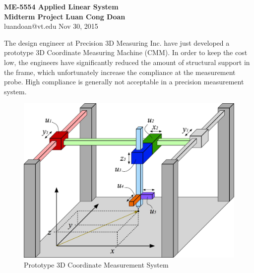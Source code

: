 \documentclass[14pt,a4paper]{article}
\begin{document}
\label{cover}
\begin{center}
	\vspace*{3cm}
	\large{\textbf{ME-5554 Applied Linear System \\ Midterm Project}}
	\vfill
	\textbf{Luan Cong Doan} \\ luandoan@vt.edu
	\vfill
	Nov 30, 2015
\end{center}
\pagebreak

The design engineer at Precision 3D Measuring Inc. have just developed a prototype 3D Coordinate Measuring Machine (CMM). In order to keep the cost low, the engineers have significantly reduced the amount of structural support in the frame, which unfortunately increase the compliance at the measurement probe. High compliance is generally not acceptable in a precision measurement system.\\

\begin{figure} [htp]
	\centering
	\includegraphics[scale=0.4]{MidtermProject.jpg}
	\caption{Prototype 3D Coordinate Measurement System}
\end{figure}
\end{document}
